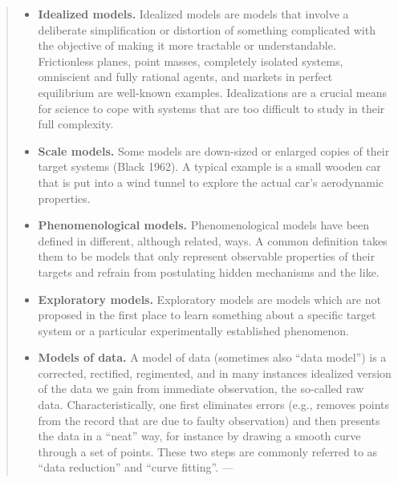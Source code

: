 \documentclass[
]{book}
\providecommand{\tightlist}{%
  \setlength{\itemsep}{0pt}\setlength{\parskip}{0pt}}
\begin{document}
\begin{quote}
\begin{itemize}
\tightlist
\item
  \textbf{Idealized models.} Idealized models are models that involve a deliberate simplification or distortion of something complicated with the objective of making it more tractable or understandable. Frictionless planes, point masses, completely isolated systems, omniscient and fully rational agents, and markets in perfect equilibrium are well-known examples. Idealizations are a crucial means for science to cope with systems that are too difficult to study in their full complexity.
\item
  \textbf{Scale models.} Some models are down-sized or enlarged copies of their target systems (Black 1962). A typical example is a small wooden car that is put into a wind tunnel to explore the actual car's aerodynamic properties.
\item
  \textbf{Phenomenological models.} Phenomenological models have been defined in different, although related, ways. A common definition takes them to be models that only represent observable properties of their targets and refrain from postulating hidden mechanisms and the like.
\item
  \textbf{Exploratory models.} Exploratory models are models which are not proposed in the first place to learn something about a specific target system or a particular experimentally established phenomenon.
\item
  \textbf{Models of data.} A model of data (sometimes also ``data model'') is a corrected, rectified, regimented, and in many instances idealized version of the data we gain from immediate observation, the so-called raw data. Characteristically, one first eliminates errors (e.g., removes points from the record that are due to faulty observation) and then presents the data in a ``neat'' way, for instance by drawing a smooth curve through a set of points. These two steps are commonly referred to as ``data reduction'' and ``curve fitting''.
  --- \citep{sep-models-science}
\end{itemize}
\end{quote}
\end{document}
